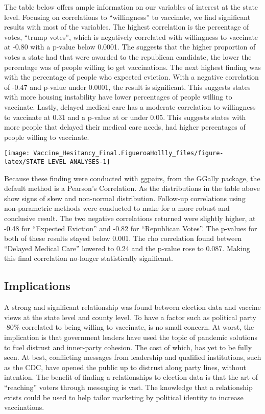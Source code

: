 \documentclass[
]{article}
\begin{document}
The table below offers ample information on our variables of interest at
the state level. Focusing on correlations to ``willingness'' to
vaccinate, we find significant results with most of the variables. The
highest correlation is the percentage of votes, ``trump votes'', which
is negatively correlated with willingness to vaccinate at -0.80 with a
p-value below 0.0001. The suggests that the higher proportion of votes a
state had that were awarded to the republican candidate, the lower the
percentage was of people willing to get vaccinations. The next highest
finding was with the percentage of people who expected eviction. With a
negative correlation of -0.47 and p-value under 0.0001, the result is
significant. This suggests states with more housing instability have
lower percentages of people willing to vaccinate. Lastly, delayed
medical care has a moderate correlation to willingness to vaccinate at
0.31 and a p-value at or under 0.05. This suggests states with more
people that delayed their medical care needs, had higher percentages of
people willing to vaccinate.

\newline

\texttt{[image: Vaccine\_Hesitancy\_Final.FigueroaHollly\_files/figure-latex/STATE LEVEL ANALYSES-1]}

Because these finding were conducted with ggpairs, from the GGally
package, the default method is a Pearson's Correlation. As the
distributions in the table above show signs of skew and non-normal
distribution. Follow-up correlations using non-parametric methods were
conducted to make for a more robust and conclusive result. The two
negative correlations returned were slightly higher, at -0.48 for
``Expected Eviction'' and -0.82 for ``Republican Votes''. The p-values
for both of these results stayed below 0.001. The rho correlation found
between ``Delayed Medical Care'' lowered to 0.24 and the p-value rose to
0.087. Making this final correlation no-longer statistically
significant.

\hypertarget{implications}{%
\subsection{Implications}\label{implications}}

A strong and significant relationship was found between election data
and vaccine views at the state level and county level. To have a factor
such as political party -80\% correlated to being willing to vaccinate,
is no small concern. At worst, the implication is that government
leaders have used the topic of pandemic solutions to fuel distrust and
inner-party cohesion. The cost of which, has yet to be fully seen. At
best, conflicting messages from leadership and qualified institutions,
such as the CDC, have opened the public up to distrust along party
lines, without intention. The benefit of finding a relationships to
election data is that the art of ``reaching'' voters through messaging
is vast. The knowledge that a relationship exists could be used to help
tailor marketing by political identity to increase vaccinations.
\end{document}
